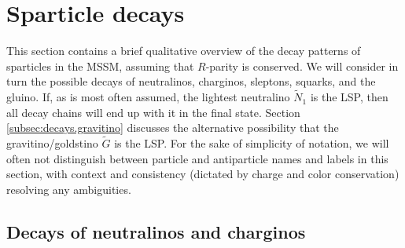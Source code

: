 \documentclass[12pt]{article}
\def\stilde{\widetilde}
\def\G{\stilde G}
\def\NI{\stilde N_1}
\begin{document}
\section{Sparticle decays}\label{sec:decays}
\setcounter{equation}{0}
\setcounter{figure}{0}
\setcounter{table}{0}
\setcounter{footnote}{1}

This section contains a brief qualitative overview of the decay patterns
of sparticles in the MSSM, assuming that $R$-parity is conserved. We will 
consider in turn the possible decays of neutralinos, charginos, sleptons, 
squarks, and the gluino. If, as is most often assumed, the lightest 
neutralino $\NI$ is the LSP, then all decay chains will end up with it in 
the final state. Section \ref{subsec:decays.gravitino} discusses the 
alternative possibility that the gravitino/goldstino $\G$ is the LSP. 
For the sake of simplicity of notation, we will often not distinguish
between particle and antiparticle names and labels in this section, with
context and consistency (dictated by charge and color conservation)
resolving any ambiguities. 

\subsection{Decays of neutralinos and
charginos}\label{subsec:decays.inos}
\setcounter{equation}{0}
\setcounter{footnote}{1}
\end{document}
